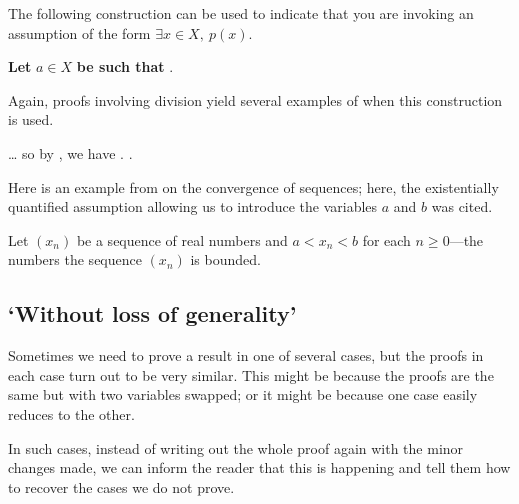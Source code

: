 \begin{vocabulary}
\label{vcbAssumingExistential}
The following construction can be used to indicate that you are invoking an assumption of the form $\exists x \in X,~p(x)$.

\begin{vocabtemplate}
\textbf{Let} $a \in X$ \textbf{be such that} .
\end{vocabtemplate}
\end{vocabulary}

Again, proofs involving division yield several examples of when this construction is used.

\begin{extract}
\label{xtrIntroducingExistentialVariableExample}
\dots{} so by , we have .  .
\end{extract}

Here is an example from  on the convergence of sequences; here, the existentially quantified assumption allowing us to introduce the variables $a$ and $b$ was cited.

\begin{extract}
\label{xtrIntroducingVariablesExistentialExampleTwo}
Let $(x_n)$ be a sequence of real numbers and  $a < x_n < b$ for each $n \ge 0$---the numbers  the sequence $(x_n)$ is bounded.
\end{extract}

\subsection*{`Without loss of generality'}

Sometimes we need to prove a result in one of several cases, but the proofs in each case turn out to be very similar. This might be because the proofs are the same but with two variables swapped; or it might be because one case easily reduces to the other.

In such cases, instead of writing out the whole proof again with the minor changes made, we can inform the reader that this is happening and tell them how to recover the cases we do not prove.


